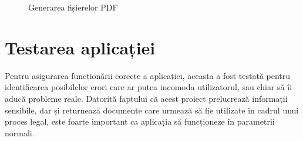 \documentclass[12pt,a4paper]{report}
\theoremstyle{definition}
\theoremstyle{remark}
\begin{document}
\begin{figure}[H]
  \centering
  \hspace{2.0cm}
  \caption{Generarea fișierelor PDF}
\end{figure}
\newpage
\section{Testarea aplicației}
\vspace{20pt}
Pentru asigurarea funcționării corecte a aplicației, aceasta a fost testată pentru identificarea posibilelor erori care ar putea incomoda utilizatorul, sau chiar să îi aducă probleme reale. Datorită faptului că acest proiect prelucrează informații sensibile, dar și returnează documente care urmează să fie utilizate în cadrul unui proces legal, este foarte important ca aplicația să funcționeze în parametrii normali.
\end{document}
